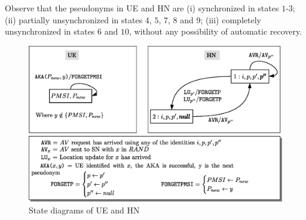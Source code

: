 \documentclass{llncs} %
\begin{document}
Observe that the pseudonyms in UE and HN are (i) synchronized in states $1$-$3$; (ii) partially unsynchronized in states $4$, $5$, $7$, $8$ and $9$; (iii) completely unsynchronized in states $6$ and $10$, without any possibility of automatic recovery.




\begin{figure}
\centering
\includegraphics[scale = .4]{HN_UE_diagrams.eps}
\caption{State diagrams of UE and HN}
\label{fig:HN_UE_diagrams}
\end{figure}
\end{document}
